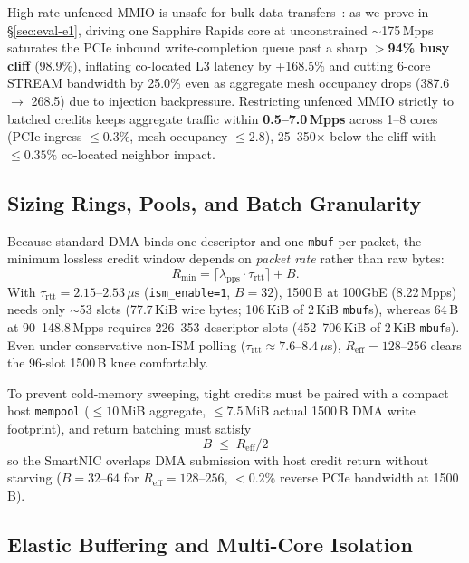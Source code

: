 High-rate unfenced MMIO is unsafe for bulk data transfers~\cite{vuppalapati2024hostnet}:
as we prove in \S\ref{sec:eval-e1}, driving one Sapphire Rapids core at
unconstrained $\sim$175\,Mpps saturates the PCIe inbound write-completion
queue past a sharp \textbf{$>$94\% busy cliff} (98.9\%), inflating co-located
L3 latency by +168.5\% and cutting 6-core STREAM bandwidth by 25.0\% even as
aggregate mesh occupancy drops (387.6 $\to$ 268.5) due to injection
backpressure. Restricting unfenced MMIO strictly to batched credits keeps
aggregate traffic within \textbf{0.5--7.0\,Mpps} across 1--8 cores (PCIe ingress
$\le 0.3\%$, mesh occupancy $\le 2.8$), 25--350$\times$ below the cliff with
$\le 0.35\%$ co-located neighbor impact.
\subsection{Sizing Rings, Pools, and Batch Granularity}
\label{sec:design-sizing}

Because standard DMA binds one descriptor and one \texttt{mbuf} per packet,
the minimum lossless credit window depends on \emph{packet rate} rather than
raw bytes:
\begin{equation}
  R_{\min} = \lceil \lambda_{\text{pps}} \cdot \tau_{\text{rtt}} \rceil + B.
  \label{eq:bdp-slots}
\end{equation}
With $\tau_{\text{rtt}} = 2.15$--$2.53\,\mu\text{s}$ (\texttt{ism\_enable=1},
$B=32$), 1500\,B at 100GbE (8.22\,Mpps) needs only $\sim$53 slots (77.7\,KiB
wire bytes; 106\,KiB of 2\,KiB \texttt{mbuf}s), whereas 64\,B at 90--148.8\,Mpps
requires 226--353 descriptor slots (452--706\,KiB of 2\,KiB \texttt{mbuf}s).
Even under conservative non-ISM polling ($\tau_{\text{rtt}} \approx 7.6$--$8.4\,\mu\text{s}$),
$R_{\text{eff}} = 128$--$256$ clears the 96-slot 1500\,B knee comfortably.

To prevent cold-memory sweeping, tight credits must be paired with a compact
host \texttt{mempool} ($\le 10$\,MiB aggregate, $\le 7.5$\,MiB actual 1500\,B
DMA write footprint), and return batching must satisfy
\begin{equation}
  B \;\le\; R_{\text{eff}} / 2
  \label{eq:batch-bound}
\end{equation}
so the SmartNIC overlaps DMA submission with host credit return without
starving ($B=32$--$64$ for $R_{\text{eff}}=128$--$256$, $<0.2\%$ reverse PCIe
bandwidth at 1500\,B).

\subsection{Elastic Buffering and Multi-Core Isolation}
\label{sec:design-fifo}

